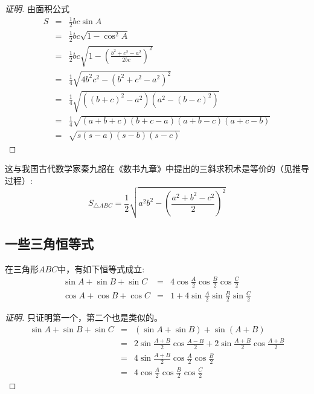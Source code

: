 \begin{proof}[证明]
  由面积公式
  \begin{eqnarray*}
    S & = & \frac{1}{2} bc \sin{A} \\
    & = & \frac{1}{2} bc \sqrt{1-\cos^2{A}} \\
    & = & \frac{1}{2} bc \sqrt{1- \left( \frac{b^2+c^2-a^2}{2bc} \right)^2} \\
    & = & \frac{1}{4} \sqrt{4b^2c^2-(b^2+c^2-a^2)^2} \\
    & = & \frac{1}{4} \sqrt{((b+c)^2-a^2)(a^2-(b-c)^2)} \\
    & = & \frac{1}{4} \sqrt{(a+b+c)(b+c-a)(a+b-c)(a+c-b)} \\
    & = & \sqrt{s(s-a)(s-b)(s-c)}
  \end{eqnarray*}
\end{proof}

\begin{example}
  这与我国古代数学家秦九韶在《数书九章》中提出的三斜求积术是等价的（见推导过程）:
  \begin{equation}
    \label{eq:three-inclined-quadrature-operation}
    S_{\triangle ABC} = \frac{1}{2} \sqrt{a^2b^2- \left( \frac{a^2+b^2-c^2}{2} \right)^2}
  \end{equation}
\end{example}

\subsection{一些三角恒等式}
\label{sec:some-equation-in-triangle}

\begin{property}
  \label{property:triangle-sinA-sinB-sinC-cosA-cosB-cosC}
  在三角形$ABC$中，有如下恒等式成立:
  \begin{eqnarray}
    \label{eq:triangle-sinA-sinB-sinC-cosA-cosB-cosC}
    \sin{A} + \sin{B} + \sin{C} & = & 4\cos{\frac{A}{2}}\cos{\frac{B}{2}}\cos{\frac{C}{2}} \\ 
    \cos{A} + \cos{B} + \cos{C} & = & 1 + 4 \sin{\frac{A}{2}}\sin{\frac{B}{2}}\sin{\frac{C}{2}}  
  \end{eqnarray}
\end{property}

\begin{proof}[证明]
  只证明第一个，第二个也是类似的。
  \begin{eqnarray*}
    \sin{A} + \sin{B} + \sin{C} & = & (\sin{A}+\sin{B})+\sin{(A+B)} \\
    & = & 2 \sin{\frac{A+B}{2}} \cos{\frac{A-B}{2}} + 2 \sin{\frac{A+B}{2}} \cos{\frac{A+B}{2}} \\
    & = & 4\sin{\frac{A+B}{2}} \cos{\frac{A}{2}} \cos{\frac{B}{2}} \\
    & = & 4\cos{\frac{A}{2}} \cos{\frac{B}{2}} \cos{\frac{C}{2}}
  \end{eqnarray*}
\end{proof}

